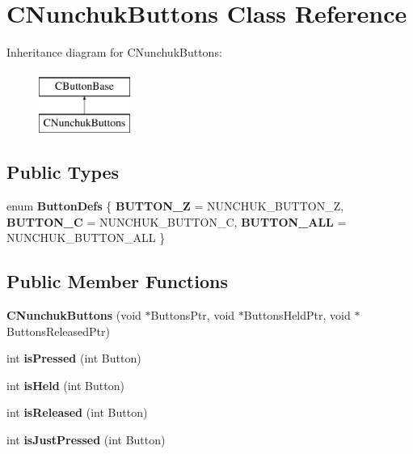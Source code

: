 \hypertarget{class_c_nunchuk_buttons}{\section{C\-Nunchuk\-Buttons Class Reference}
\label{class_c_nunchuk_buttons}
}
Inheritance diagram for C\-Nunchuk\-Buttons\-:\begin{figure}[H]
\begin{center}
\leavevmode
\includegraphics[height=2.000000cm]{class_c_nunchuk_buttons}
\end{center}
\end{figure}
\subsection*{Public Types}
\begin{DoxyCompactItemize}
\item 
enum {\bfseries Button\-Defs} \{ {\bfseries B\-U\-T\-T\-O\-N\-\_\-\-Z} =  N\-U\-N\-C\-H\-U\-K\-\_\-\-B\-U\-T\-T\-O\-N\-\_\-\-Z, 
{\bfseries B\-U\-T\-T\-O\-N\-\_\-\-C} =  N\-U\-N\-C\-H\-U\-K\-\_\-\-B\-U\-T\-T\-O\-N\-\_\-\-C, 
{\bfseries B\-U\-T\-T\-O\-N\-\_\-\-A\-L\-L} =  N\-U\-N\-C\-H\-U\-K\-\_\-\-B\-U\-T\-T\-O\-N\-\_\-\-A\-L\-L
 \}
\end{DoxyCompactItemize}
\subsection*{Public Member Functions}
\begin{DoxyCompactItemize}
\item 
\hypertarget{class_c_nunchuk_buttons_a9ba6eadd235b5078f8d1b751488b7002}{{\bfseries C\-Nunchuk\-Buttons} (void $\ast$Buttons\-Ptr, void $\ast$Buttons\-Held\-Ptr, void $\ast$Buttons\-Released\-Ptr)}\label{class_c_nunchuk_buttons_a9ba6eadd235b5078f8d1b751488b7002}

\item 
\hypertarget{class_c_button_base_a0d4758b9e756a8c3c2bb39b907ea9170}{int {\bfseries is\-Pressed} (int Button)}\label{class_c_button_base_a0d4758b9e756a8c3c2bb39b907ea9170}

\item 
\hypertarget{class_c_button_base_a67e38daead9d22e33f6a3d85902d1f98}{int {\bfseries is\-Held} (int Button)}\label{class_c_button_base_a67e38daead9d22e33f6a3d85902d1f98}

\item 
\hypertarget{class_c_button_base_a575dee487bcca1abf29c1084dfdd5bb8}{int {\bfseries is\-Released} (int Button)}\label{class_c_button_base_a575dee487bcca1abf29c1084dfdd5bb8}

\item 
\hypertarget{class_c_button_base_ab74fd21217c5e379a613b7474af4f9b8}{int {\bfseries is\-Just\-Pressed} (int Button)}\label{class_c_button_base_ab74fd21217c5e379a613b7474af4f9b8}

\end{DoxyCompactItemize}
